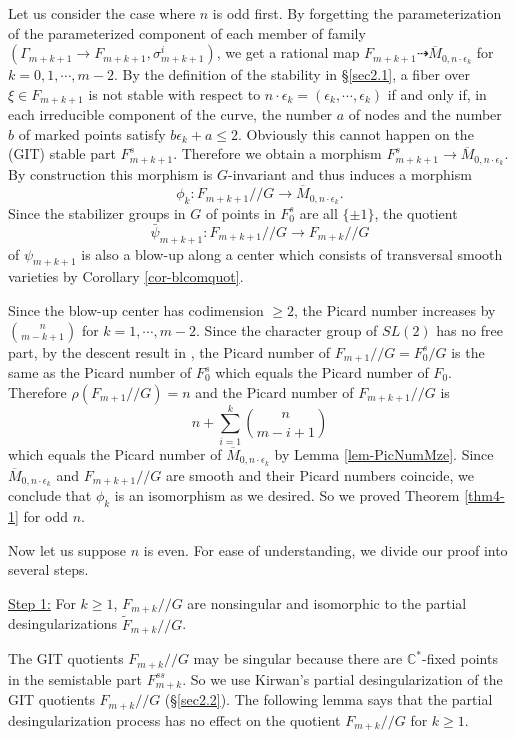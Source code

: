 \documentclass[10pt]{amsart}
\theoremstyle{definition}
\newcommand{\CC}{\mathbb{C}}
\def\Mzek{\overline{M}_{0,n\cdot \epsilon_k} }
\def\git{/\!/ }
\begin{document}
Let us consider the case where $n$ is odd first. By forgetting the
parameterization of the parameterized component of each member of
family $(\Gamma_{m+k+1}\to F_{m+k+1},\sigma_{m+k+1}^i)$, we get a
rational map $F_{m+k+1}\dashrightarrow \Mzek$ for $k=0,1,\cdots,
m-2$. By the definition of the stability in \S\ref{sec2.1}, a
fiber over $\xi\in F_{m+k+1}$ is not stable with respect to
$n\cdot \epsilon_k=(\epsilon_k,\cdots,\epsilon_k)$ if and only if,
in each irreducible component of the curve, the number $a$ of
nodes and the number $b$ of marked points satisfy
$b\epsilon_k+a\le 2$. Obviously this cannot happen on the (GIT)
stable part $F_{m+k+1}^s$. Therefore we obtain a morphism
$F_{m+k+1}^s\to \Mzek$. By construction this morphism is
$G$-invariant and thus induces a morphism
$$\phi_k:F_{m+k+1}\git G\to \Mzek.$$ Since the stabilizer groups
in $G$ of points in $F_0^s$ are all $\{ \pm 1\}$, the quotient
$$\bar{\psi}_{m+k+1}:F_{m+k+1}\git G\to F_{m+k}\git G$$ of
$\psi_{m+k+1}$ is also a blow-up along a center which consists of
transversal smooth varieties by Corollary \ref{cor-blcomquot}.

Since the blow-up center has codimension $\ge 2$, the Picard
number increases by $\binom{n}{m-k+1}$ for $k=1, \cdots, m-2$.
Since the character group of $SL(2)$ has no free part, by the
descent result in \cite{DN}, the Picard number of $F_{m+1}\git
G=F_0^s/G$ is the same as the Picard number of $F_0^s$ which
equals the Picard number of $F_0$. Therefore $\rho(F_{m+1}\git
G)=n$ and the Picard number of $F_{m+k+1}\git G$ is
\[
n+\sum_{i=1}^{k}\binom{n}{m-i+1}
\]
which equals the Picard number of $\Mzek$ by Lemma
\ref{lem-PicNumMze}. Since $\Mzek$ and $F_{m+k+1}\git G$ are
smooth and their Picard numbers coincide, we conclude that
$\phi_k$ is an isomorphism as we desired. So we proved Theorem
\ref{thm4-1} for odd $n$.

Now let us suppose $n$ is even. For ease of understanding, we
divide our proof into several steps.

\bigskip
\noindent \underline{Step 1:} For $k\ge 1$, $F_{m+k}\git G$ are
nonsingular and isomorphic to the partial desingularizations
$\tilde{F}_{m+k}\git G$.

\bigskip
The GIT quotients $F_{m+k}\git G$ may be singular because there
are $\CC^*$-fixed points in the semistable part $F_{m+k}^{ss}$. So
we use Kirwan's partial desingularization of the GIT quotients
$F_{m+k}\git G$ (\S\ref{sec2.2}). The following lemma says that
the partial desingularization process has no effect on the
quotient $F_{m+k}\git G$ for $k\ge 1$.
\end{document}
